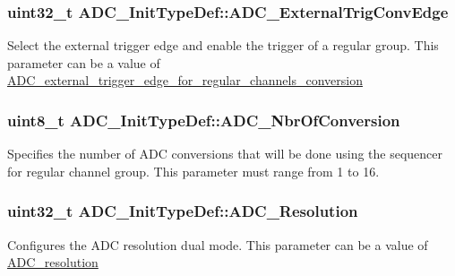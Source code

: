 \subsubsection[{A\+D\+C\+\_\+\+External\+Trig\+Conv\+Edge}]{\setlength{\rightskip}{0pt plus 5cm}uint32\+\_\+t A\+D\+C\+\_\+\+Init\+Type\+Def\+::\+A\+D\+C\+\_\+\+External\+Trig\+Conv\+Edge}\label{struct_a_d_c___init_type_def_abe372c73942aef47016be85ca1b79650}
Select the external trigger edge and enable the trigger of a regular group. This parameter can be a value of \hyperlink{group___a_d_c__external__trigger__edge__for__regular__channels__conversion}{A\+D\+C\+\_\+external\+\_\+trigger\+\_\+edge\+\_\+for\+\_\+regular\+\_\+channels\+\_\+conversion} \hypertarget{struct_a_d_c___init_type_def_a4a508c4bed196dcd50ba03b49c78f460}{}
\subsubsection[{A\+D\+C\+\_\+\+Nbr\+Of\+Conversion}]{\setlength{\rightskip}{0pt plus 5cm}uint8\+\_\+t A\+D\+C\+\_\+\+Init\+Type\+Def\+::\+A\+D\+C\+\_\+\+Nbr\+Of\+Conversion}\label{struct_a_d_c___init_type_def_a4a508c4bed196dcd50ba03b49c78f460}
Specifies the number of A\+D\+C conversions that will be done using the sequencer for regular channel group. This parameter must range from 1 to 16. \hypertarget{struct_a_d_c___init_type_def_a275d9553bbe17a60d618b619678b7c94}{}
\subsubsection[{A\+D\+C\+\_\+\+Resolution}]{\setlength{\rightskip}{0pt plus 5cm}uint32\+\_\+t A\+D\+C\+\_\+\+Init\+Type\+Def\+::\+A\+D\+C\+\_\+\+Resolution}\label{struct_a_d_c___init_type_def_a275d9553bbe17a60d618b619678b7c94}
Configures the A\+D\+C resolution dual mode. This parameter can be a value of \hyperlink{group___a_d_c__resolution}{A\+D\+C\+\_\+resolution} \hypertarget{struct_a_d_c___init_type_def_aaf44f54f22ab40bf8fae01f075aa4c87}{}
